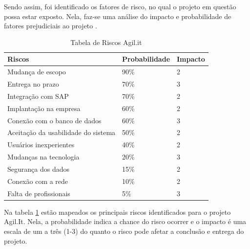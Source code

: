{Sendo assim, foi identificado os fatores de risco, no qual o projeto em questão possa estar exposto. Nela, faz-se uma análise do impacto e probabilidade de fatores prejudiciais ao projeto .
\newpage
\begin{table}[]
	\begin{tabular}{l|l|l}
		\hline
		\rowcolor[HTML]{EFEFEF} 
		\textbf{Riscos}                     & \textbf{Probabilidade} & \textbf{Impacto} \\ \hline
		\rowcolor[HTML]{DD7346} 
		Mudança de escopo                   & 90\%                   & 2                \\ \hline
		\rowcolor[HTML]{DD7346} 
		Entrega no prazo                    & 70\%                   & 3                \\ \hline
		\rowcolor[HTML]{DD7346} 
		Integração com SAP                  & 70\%                   & 2                \\ \hline
		\rowcolor[HTML]{FFFE65} 
		Implantação na empresa              & 60\%                   & 2                \\ \hline
		\rowcolor[HTML]{FFFE65} 
		Conexão com o banco de dados        & 60\%                   & 3                \\ \hline
		\rowcolor[HTML]{FFFE65} 
		Aceitação da usabilidade do sistema & 50\%                   & 2                \\ \hline
		\rowcolor[HTML]{FFFE65} 
		Usuários inexperientes              & 40\%                   & 2                \\ \hline
		\rowcolor[HTML]{9AFF99} 
		Mudanças na tecnologia              & 20\%                   & 3                \\ \hline
		\rowcolor[HTML]{9AFF99} 
		Segurança dos dados                 & 15\%                   & 2                \\ \hline
		\rowcolor[HTML]{9AFF99} 
		Conexão com a rede                  & 10\%                   & 2                \\ \hline
		\rowcolor[HTML]{9AFF99} 
		Falta de profissionais              & 5\%                    & 3                \\ \hline
	\end{tabular}
	\caption{\label{tebela_risco} Tabela de Riscos Agil.it}
\end{table}

Na tabela \ref{tebela_risco} estão mapeados os principais riscos identificados para o projeto Agil.It. Nela, a probabilidade indica a chance do risco ocorrer e o impacto é uma escala de um a três (1-3) do quanto o risco pode afetar a conclusão e entrega do projeto.}

